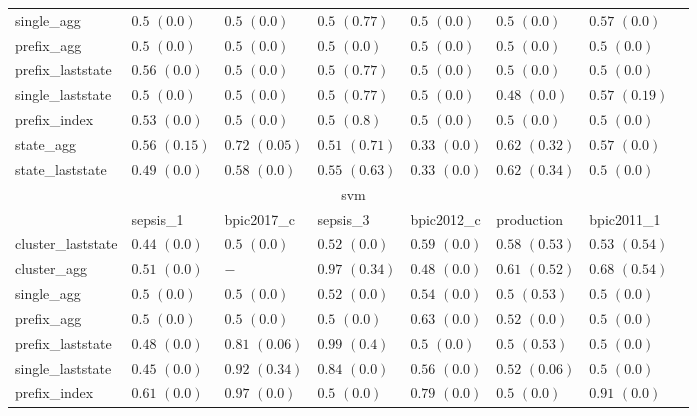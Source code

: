 \documentclass[twoside,11pt]{Latex/Classes/PhDthesisPSnPDF}
\begin{document}
\begin{table}[h]
{\begin{tabular}{llllllll}
			single\_agg & $0.5$ ${(0.0)}$ & $0.5$ ${(0.0)}$ & $0.5$ ${(0.77)}$ & $0.5$ ${(0.0)}$ & $0.5$ ${(0.0)}$ & $0.57$ ${(0.0)}$ \\
			prefix\_agg & $0.5$ ${(0.0)}$ & $0.5$ ${(0.0)}$ & $0.5$ ${(0.0)}$ & $0.5$ ${(0.0)}$ & $0.5$ ${(0.0)}$ & $0.5$ ${(0.0)}$ \\
			prefix\_laststate & $0.56$ ${(0.0)}$ & $0.5$ ${(0.0)}$ & $0.5$ ${(0.77)}$ & $0.5$ ${(0.0)}$ & $0.5$ ${(0.0)}$ & $0.5$ ${(0.0)}$ \\
			single\_laststate & $0.5$ ${(0.0)}$ & $0.5$ ${(0.0)}$ & $0.5$ ${(0.77)}$ & $0.5$ ${(0.0)}$ & $0.48$ ${(0.0)}$ & $0.57$ ${(0.19)}$ \\
			prefix\_index & $0.53$ ${(0.0)}$ & $0.5$ ${(0.0)}$ & $0.5$ ${(0.8)}$ & $0.5$ ${(0.0)}$ & $0.5$ ${(0.0)}$ & $0.5$ ${(0.0)}$ \\
			state\_agg & $0.56$ ${(0.15)}$ & $0.72$ ${(0.05)}$ & $0.51$ ${(0.71)}$ & $0.33$ ${(0.0)}$ & $0.62$ ${(0.32)}$ & $0.57$ ${(0.0)}$ \\
			state\_laststate & $0.49$ ${(0.0)}$ & $0.58$ ${(0.0)}$ & $0.55$ ${(0.63)}$ & $0.33$ ${(0.0)}$ & $0.62$ ${(0.34)}$ & $0.5$ ${(0.0)}$ \\
			\bottomrule
			\toprule
			& \multicolumn{5}{c}{svm}
			\\
			& sepsis\_1 & bpic2017\_c & sepsis\_3 & bpic2012\_c & production & bpic2011\_1
			\\ \midrule
			cluster\_laststate & $0.44$ ${(0.0)}$ & $0.5$ ${(0.0)}$ & $0.52$ ${(0.0)}$ & $0.59$ ${(0.0)}$ & $0.58$ ${(0.53)}$ & $0.53$ ${(0.54)}$ \\
			cluster\_agg & $0.51$ ${(0.0)}$ & $-$  & $0.97$ ${(0.34)}$ & $0.48$ ${(0.0)}$ & $0.61$ ${(0.52)}$ & $0.68$ ${(0.54)}$ \\
			single\_agg & $0.5$ ${(0.0)}$ & $0.5$ ${(0.0)}$ & $0.52$ ${(0.0)}$ & $0.54$ ${(0.0)}$ & $0.5$ ${(0.53)}$ & $0.5$ ${(0.0)}$ \\
			prefix\_agg & $0.5$ ${(0.0)}$ & $0.5$ ${(0.0)}$ & $0.5$ ${(0.0)}$ & $0.63$ ${(0.0)}$ & $0.52$ ${(0.0)}$ & $0.5$ ${(0.0)}$ \\
			prefix\_laststate & $0.48$ ${(0.0)}$ & $0.81$ ${(0.06)}$ & $0.99$ ${(0.4)}$ & $0.5$ ${(0.0)}$ & $0.5$ ${(0.53)}$ & $0.5$ ${(0.0)}$ \\
			single\_laststate & $0.45$ ${(0.0)}$ & $0.92$ ${(0.34)}$ & $0.84$ ${(0.0)}$ & $0.56$ ${(0.0)}$ & $0.52$ ${(0.06)}$ & $0.5$ ${(0.0)}$ \\
			prefix\_index & $\mathbf{0.61}$ $\mathbf{(0.0)}$  & $0.97$ ${(0.0)}$ & $0.5$ ${(0.0)}$ & $0.79$ ${(0.0)}$ & $0.5$ ${(0.0)}$ & $0.91$ ${(0.0)}$ \\

\end{tabular}}
\end{table}
\end{document}
